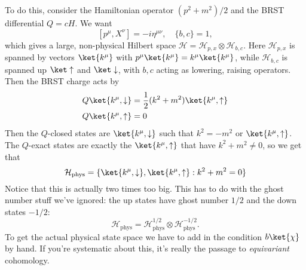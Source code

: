 To do this, consider the Hamiltonian operator $(p^2 + m^2)/2$ and the BRST differential $Q = cH$.
We want
\[
[p^\mu, X^\nu] = - i \eta^{\mu \nu}, \quad \{ b, c\} =1,
\]
which gives a large, non-physical Hilbert space $\mathcal H = \mathcal H_{p,x} \otimes \mathcal H_{b,c}$.
Here $\mathcal H_{p,x}$ is spanned by vectors $\ket{k^\mu}$ with $p^\mu \ket{k^\mu} = k^\mu \ket{k^\mu}$, while $\mathcal H_{b,c}$ is spanned up $\ket \uparrow$ and $\ket \downarrow$, with $b,c$  acting as lowering, raising operators.
Then the BRST charge acts by
\begin{align*}
Q \ket{k^\mu, \downarrow} &= \frac{1}{2} (k^2 + m^2) \ket{k^\mu, \uparrow}\\
Q \ket{k^\mu, \uparrow} &= 0
\end{align*}
Then the $Q$-closed states are $\ket{k^\mu, \downarrow}$ such that $k^2  = -m^2$ or $\ket{k^\mu, \uparrow}$.
The $Q$-exact states are exactly the $\ket{k^\mu, \uparrow}$ that have $k^2 + m^2 \ne 0$, so we get that
\[
\mathcal H_{\text{phys}} = \{\ket{k^\mu, \downarrow}, \ket{k^\mu, \uparrow} : k^2 + m^2 = 0 \}
\]
Notice that this is actually two times too big.
This has to do with the ghost number stuff we've ignored: the up states have ghost number $1/2$ and the down states $-1/2$:
\[
\mathcal H_{\text{phys}} = \mathcal H_{\text{phys}}^{1/2} \otimes \mathcal H_{\text{phys}}^{-1/2}.
\]
To get the actual physical state space we have to add in the condition $b \ket{\chi}$ by hand.
If you're systematic about this, it's really the passage to \emph{equivariant} cohomology.